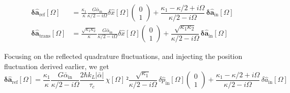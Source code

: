 \begin{equation}
  \begin{split}
  \mathbf{\delta \hat{a}_{\mathrm{ref}}}[\Omega]   &=  \frac{\kappa_1}{\kappa}\frac{G \bar{\alpha}_{\mathrm{in}}}{\kappa/2 - i\Omega} \delta \hat{x}[\Omega] \begin{pmatrix} 0\\ 1\end{pmatrix}  + \dfrac{\kappa_1-\kappa/2+i\Omega}{\kappa/2-i\Omega}  \,  \mathbf{\delta \hat{a}_{\mathrm{in}}}[\Omega]   \\
  \mathbf{\delta \hat{a}_{\mathrm{trans}}}[\Omega]   &=  \frac{\sqrt{\kappa_1 \kappa_2}}{\kappa}\frac{ G\bar{\alpha}_{\mathrm{in}}}{\kappa/2 - i\Omega} \delta \hat{x}[\Omega] \begin{pmatrix} 0\\ 1\end{pmatrix} +  \dfrac{ \sqrt{\kappa_1 \kappa_2}}{\kappa/2-i\Omega}  \, \mathbf{\delta \hat{a}_{\mathrm{in}}}[\Omega]  
  \end{split}
\end{equation}

Focusing on the reflected quadrature fluctuations, and injecting the position fluctuation derived earlier, we get
\begin{equation}
  \mathbf{\delta \hat{a}_{\mathrm{ref}}}[\Omega]  = \frac{\kappa_1}{\kappa}\frac{G \bar{\alpha}_{\mathrm{in}}}{\kappa/2 - i\Omega} \frac{2\hbar k_L |\bar \alpha|}{\tau_c}  \,  \chi[\Omega] \,  ² \frac{\sqrt{\kappa_{\mathrm{1}}}}{\kappa/2 - i\Omega} \, \delta \hat{p}_{\mathrm{in}}[\Omega] \begin{pmatrix} 0\\ 1\end{pmatrix}  + \dfrac{\kappa_1-\kappa/2+i\Omega}{\kappa/2-i\Omega}  \,  \delta \hat{a}_{\mathrm{in}}[\Omega]   
\end{equation}


